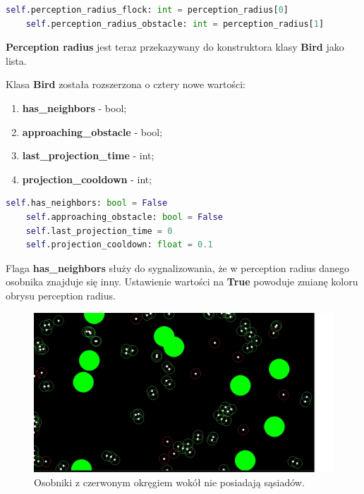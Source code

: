 \documentclass[12pt,a4paper,table]{article}
\begin{document}
    \begin{lstlisting}[language=Python]
    self.perception_radius_flock: int = perception_radius[0]
    self.perception_radius_obstacle: int = perception_radius[1]
    \end{lstlisting}

    \textbf{Perception radius} jest teraz przekazywany do konstruktora klasy \textbf{Bird} jako lista.

    Klasa \textbf{Bird} została rozszerzona o cztery nowe wartości:

    \begin{enumerate}
        \item \textbf{has\_neighbors} - bool;
        \item \textbf{approaching\_obstacle} - bool;
        \item \textbf{last\_projection\_time} - int;
        \item \textbf{projection\_cooldown} - int;
    \end{enumerate}

    \begin{lstlisting}[language=Python]
    self.has_neighbors: bool = False
    self.approaching_obstacle: bool = False
    self.last_projection_time = 0
    self.projection_cooldown: float = 0.1
    \end{lstlisting}

    Flaga \textbf{has\_neighbors} służy do sygnalizowania, że w perception radius danego osobnika znajduje się inny. Ustawienie wartości na \textbf{True} powoduje zmianę koloru obrysu perception radius.    

    \begin{figure}[H]
        \centering
        \includegraphics[width=1\textwidth]{images/perception_radius.jpg}
        \caption{Osobniki z czerwonym okręgiem wokół nie posiadają sąsiadów.}
        \label{fig:example}
    \end{figure}
\end{document}
